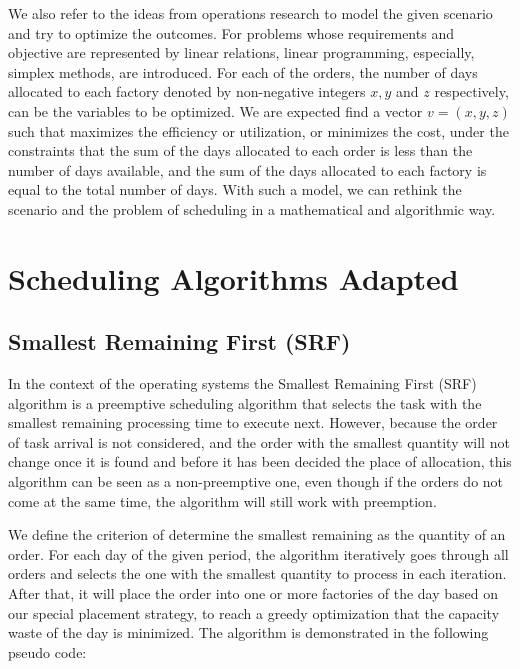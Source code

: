 \documentclass[a4paper, 12pt]{article}
\begin{document}
We also refer to the ideas from operations research to model the given scenario and try to optimize the outcomes. For problems whose requirements and objective are represented by linear relations,
linear programming, especially, simplex methods, are introduced. For each of the orders, the number of days allocated to each factory denoted by non-negative integers $x, y$ and $z$ respectively, can be the variables to be optimized.
We are expected find a vector $v = (x, y, z)$ such that maximizes the efficiency or utilization, or minimizes the cost, under the constraints that the sum of the days allocated to each order is less than the number of days available, and the sum of the days allocated to each factory is equal to the total number of days.
With such a model, we can rethink the scenario and the problem of scheduling in a mathematical and algorithmic way.

\section{Scheduling Algorithms Adapted}

\subsection{Smallest Remaining First (SRF)}

In the context of the operating systems the Smallest Remaining First (SRF) algorithm is a preemptive scheduling algorithm that selects the task with the smallest remaining processing time to execute next. 
However, because the order of task arrival is not considered, and the order with the smallest quantity will not change once it is found and before it has been decided the place of allocation,
this algorithm can be seen as a non-preemptive one, even though if the orders do not come at the same time, the algorithm will still work with preemption.

We define the criterion of determine the smallest remaining as the quantity of an order. For each day of the given period, the algorithm iteratively goes through all orders and selects the one with the smallest quantity to process in each iteration.
After that, it will place the order into one or more factories of the day based on our special placement strategy, to reach a greedy optimization that the capacity waste of the day is minimized. The algorithm 
is demonstrated in the following pseudo code:
\end{document}
